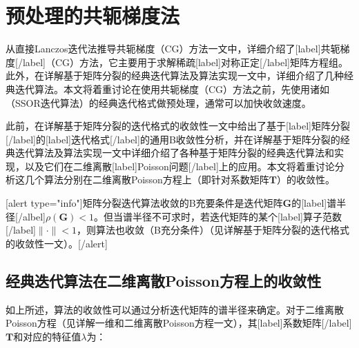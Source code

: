 \documentclass[12pt, UTF8, nofonts]{ctexart}
\begin{document}

\section*{预处理的共轭梯度法}

从直接Lanczos迭代法推导共轭梯度（CG）方法一文中，详细介绍了[label]共轭梯度[/label]（CG）方法，它主要用于求解稀疏[label]对称正定[/label]矩阵方程组。此外，在详解基于矩阵分裂的经典迭代算法及算法实现一文中，详细介绍了几种经典迭代算法。本文将着重讨论在使用共轭梯度（CG）方法之前，先使用诸如（SSOR迭代算法）的经典迭代格式做预处理，通常可以加快收敛速度。



\pagebreak

此前，在详解基于矩阵分裂的迭代格式的收敛性一文中给出了基于[label]矩阵分裂[/label]的[label]迭代格式[/label]的通用B收敛性分析，并在详解基于矩阵分裂的经典迭代算法及算法实现一文中详细介绍了各种基于矩阵分裂的经典迭代算法和实现，以及它们在二维离散[label]Poisson问题[/label]上的应用。本文将着重讨论分析这几个算法分别在二维离散Poisson方程上（即针对系数矩阵$\boldsymbol{T}$）的收敛性。

[alert type="info"]矩阵分裂迭代算法收敛的B充要条件是迭代矩阵$\boldsymbol{G}$的[label]谱半径[/albel]$\rho(\boldsymbol{G})<1$。但当谱半径不可求时，若迭代矩阵的某个[label]算子范数[/label]$\|\cdot\|<1$，则算法也收敛（B充分条件）（见详解基于矩阵分裂的迭代格式的收敛性一文）。[/alert]

\subsection*{经典迭代算法在二维离散Poisson方程上的收敛性}

如上所述，算法的收敛性可以通过分析迭代矩阵的谱半径来确定。对于二维离散Poisson方程（见详解一维和二维离散Poisson方程一文），其[label]系数矩阵[/label]$\boldsymbol{T}$和对应的特征值$\lambda$为：
\end{document}
